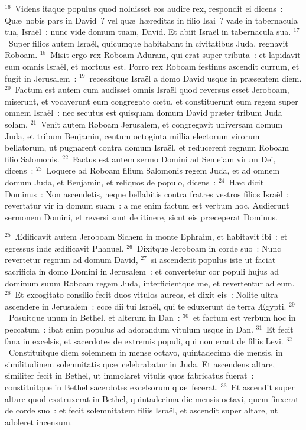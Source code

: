 ${}^{16}$~Videns itaque populus quod noluisset eos audire rex, respondit ei dicens~: Qu\ae\ nobis pars in David~? vel qu\ae\ h\ae reditas in filio Isai~? vade in tabernacula tua, Isra\"el~: nunc vide domum tuam, David. Et abiit Isra\"el in tabernacula sua.
${}^{17}$~Super filios autem Isra\"el, quicumque habitabant in civitatibus Juda, regnavit Roboam.
${}^{18}$~Misit ergo rex Roboam Aduram, qui erat super tributa~: et lapidavit eum omnis Isra\"el, et mortuus est. Porro rex Roboam festinus ascendit currum, et fugit in Jerusalem~:
${}^{19}$~recessitque Isra\"el a domo David usque in pr\ae sentem diem.
${}^{20}$~Factum est autem cum audisset omnis Isra\"el quod reversus esset Jeroboam, miserunt, et vocaverunt eum congregato cœtu, et constituerunt eum regem super omnem Isra\"el~: nec secutus est quisquam domum David pr\ae ter tribum Juda solam.
${}^{21}$~Venit autem Roboam Jerusalem, et congregavit universam domum Juda, et tribum Benjamin, centum octoginta millia electorum virorum bellatorum, ut pugnarent contra domum Isra\"el, et reducerent regnum Roboam filio Salomonis.
${}^{22}$~Factus est autem sermo Domini ad Semeiam virum Dei, dicens~:
${}^{23}$~Loquere ad Roboam filium Salomonis regem Juda, et ad omnem domum Juda, et Benjamin, et reliquos de populo, dicens~:
${}^{24}$~H\ae c dicit Dominus~: Non ascendetis, neque bellabitis contra fratres vestros filios Isra\"el~: revertatur vir in domum suam~: a me enim factum est verbum hoc. Audierunt sermonem Domini, et reversi sunt de itinere, sicut eis pr\ae ceperat Dominus.


${}^{25}$~\AE dificavit autem Jeroboam Sichem in monte Ephraim, et habitavit ibi~: et egressus inde \ae dificavit Phanuel.
${}^{26}$~Dixitque Jeroboam in corde suo~: Nunc revertetur regnum ad domum David,
${}^{27}$~si ascenderit populus iste ut faciat sacrificia in domo Domini in Jerusalem~: et convertetur cor populi hujus ad dominum suum Roboam regem Juda, interficientque me, et revertentur ad eum.
${}^{28}$~Et excogitato consilio fecit duos vitulos aureos, et dixit eis~: Nolite ultra ascendere in Jerusalem~: ecce dii tui Isra\"el, qui te eduxerunt de terra \AE gypti.
${}^{29}$~Posuitque unum in Bethel, et alterum in Dan~:
${}^{30}$~et factum est verbum hoc in peccatum~: ibat enim populus ad adorandum vitulum usque in Dan.
${}^{31}$~Et fecit fana in excelsis, et sacerdotes de extremis populi, qui non erant de filiis Levi.
${}^{32}$~Constituitque diem solemnem in mense octavo, quintadecima die mensis, in similitudinem solemnitatis qu\ae\ celebrabatur in Juda. Et ascendens altare, similiter fecit in Bethel, ut immolaret vitulis quos fabricatus fuerat~: constituitque in Bethel sacerdotes excelsorum qu\ae\ fecerat.
${}^{33}$~Et ascendit super altare quod exstruxerat in Bethel, quintadecima die mensis octavi, quem finxerat de corde suo~: et fecit solemnitatem filiis Isra\"el, et ascendit super altare, ut adoleret incensum.

